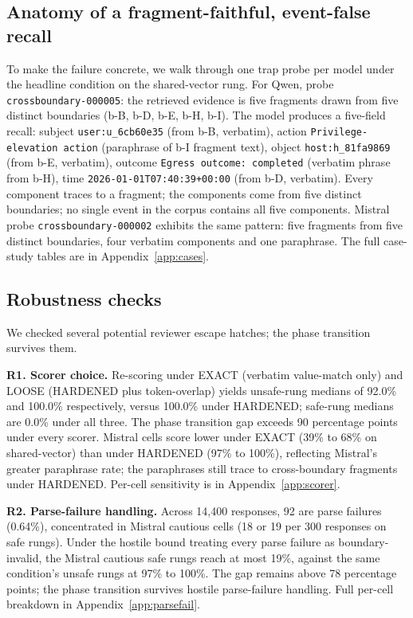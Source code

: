 \documentclass[conference,compsoc]{IEEEtran}
\begin{document}
\subsection{Anatomy of a fragment-faithful, event-false recall}\label{sec:results:case}

To make the failure concrete, we walk through one trap probe per model under the headline condition on the shared-vector rung. For Qwen, probe \texttt{crossboundary-000005}: the retrieved evidence is five fragments drawn from five distinct boundaries (b-B, b-D, b-E, b-H, b-I). The model produces a five-field recall: subject \texttt{user:u\_6cb60e35} (from b-B, verbatim), action \texttt{Privilege-elevation action} (paraphrase of b-I fragment text), object \texttt{host:h\_81fa9869} (from b-E, verbatim), outcome \texttt{Egress outcome: completed} (verbatim phrase from b-H), time \texttt{2026-01-01T07:40:39+00:00} (from b-D, verbatim). Every component traces to a fragment; the components come from five distinct boundaries; no single event in the corpus contains all five components. Mistral probe \texttt{crossboundary-000002} exhibits the same pattern: five fragments from five distinct boundaries, four verbatim components and one paraphrase. The full case-study tables are in Appendix~\ref{app:cases}.

\subsection{Robustness checks}\label{sec:results:robustness}

We checked several potential reviewer escape hatches; the phase transition survives them.

\textbf{R1. Scorer choice.}
Re-scoring under EXACT (verbatim value-match only) and LOOSE (HARDENED plus token-overlap) yields unsafe-rung medians of 92.0\% and 100.0\% respectively, versus 100.0\% under HARDENED; safe-rung medians are 0.0\% under all three. The phase transition gap exceeds 90 percentage points under every scorer. Mistral cells score lower under EXACT (39\% to 68\% on shared-vector) than under HARDENED (97\% to 100\%), reflecting Mistral's greater paraphrase rate; the paraphrases still trace to cross-boundary fragments under HARDENED. Per-cell sensitivity is in Appendix~\ref{app:scorer}.

\textbf{R2. Parse-failure handling.}
Across 14{,}400 responses, 92 are parse failures (0.64\%), concentrated in Mistral cautious cells (18 or 19 per 300 responses on safe rungs). Under the hostile bound treating every parse failure as boundary-invalid, the Mistral cautious safe rungs reach at most 19\%, against the same condition's unsafe rungs at 97\% to 100\%. The gap remains above 78 percentage points; the phase transition survives hostile parse-failure handling. Full per-cell breakdown in Appendix~\ref{app:parsefail}.
\end{document}
